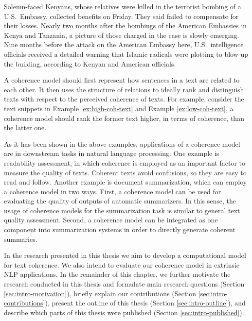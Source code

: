 \begin{examples}
\label{ex:low-coh-text}
Solemn-faced Kenyans, whose relatives were killed in the terrorist bombing of a U.S.\ Embassy, collected benefits on Friday. 
They said failed to compensate for their losses. 
Nearly two months after the bombings of the American Embassies in Kenya and Tanzania, a picture of those charged in the case is slowly emerging. 
Nine months before the attack on the American Embassy here, U.S.\ intelligence officials received a detailed warning that Islamic radicals were plotting to blow up the building, according to Kenyan and American officials. 
\end{examples}

A coherence model should first represent how sentences in a text are related to each other. 
It then uses the structure of relations to ideally rank and distinguish texts with respect to the perceived coherence of texts. 
For example, consider the text snippets in Example \ref{ex:high-coh-text} and Example \ref{ex:low-coh-text}, a coherence model should rank the former text higher, in terms of coherence, than the latter one. 

As it has been shown in the above examples, applications of a coherence model are in downstream tasks in natural language processing. 
One example is readability assessment, in which coherence is employed as an important factor to measure the quality of texts. 
Coherent texts avoid confusions, so they are easy to read and follow. 
Another example is document summarization, which can employ a coherence model in two ways. 
First, a coherence model can be used for evaluating the quality of outputs of automatic summarizers. 
In this sense, the usage of coherence models for the summarization task is similar to general text quality assessment. 
Second, a coherence model can be integrated as one component into summarization systems in order to directly generate coherent summaries. 


In the research presented in this thesis we aim to develop a computational model for text coherence. 
We also intend to evaluate our coherence model in extrinsic NLP applications. 
In the remainder of this chapter, we further motivate the research conducted in this thesis and formulate main research questions (Section \ref{sec:intro-motivation}), briefly explain our contributions (Section \ref{sec:intro-contributions}), present the outline of this thesis (Section \ref{sec:intro-outline}), and describe which parts of this thesis were published (Section \ref{sec:intro-published}). 

